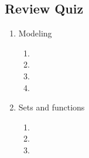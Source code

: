 \newpage
\subsection*{Review Quiz}
\begin{enumerate}
\item Modeling
\begin{enumerate}
    \item {}
    \item {}
    \item {}
    \item {}
\end{enumerate}
\item Sets and functions
\begin{enumerate}
    \item {}
    \item {}
    \item {}
\end{enumerate}

\end{enumerate}

